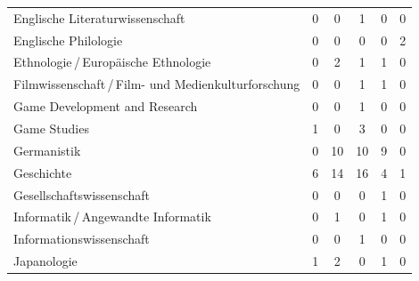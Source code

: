 \documentclass{scrartcl}
\begin{document}
\begin{landscape}
\begin{longtable}{L{7.5cm}ccccc}
      Englische Literaturwissenschaft                         & 0                     &  0                       &  1                       & 0                    & 0                       \\
      Englische Philologie                                    & 0                     &  0                       &  0                       & 0                    & 2                       \\
      Ethnologie\,/\,Europäische Ethnologie                   & 0                     &  2                       &  1                       & 1                    & 0                       \\
      Filmwissenschaft\,/\,Film- und Medienkulturforschung    & 0                     &  0                       &  1                       & 1                    & 0                       \\
      Game Development and Research                           & 0                     &  0                       &  1                       & 0                    & 0                       \\
      Game Studies                                            & 1                     &  0                       &  3                       & 0                    & 0                       \\
      Germanistik                                             & 0                     & 10                       & 10                       & 9                    & 0                       \\
      Geschichte                                              & 6                     & 14                       & 16                       & 4                    & 1                       \\
      Gesellschaftswissenschaft                               & 0                     &  0                       &  0                       & 1                    & 0                       \\
      Informatik\,/\,Angewandte Informatik                    & 0                     &  1                       &  0                       & 1                    & 0                       \\
      Informationswissenschaft                                & 0                     &  0                       &  1                       & 0                    & 0                       \\
      Japanologie                                             & 1                     &  2                       &  0                       & 1                    & 0                       \\

\end{longtable}
\end{landscape}
\end{document}
